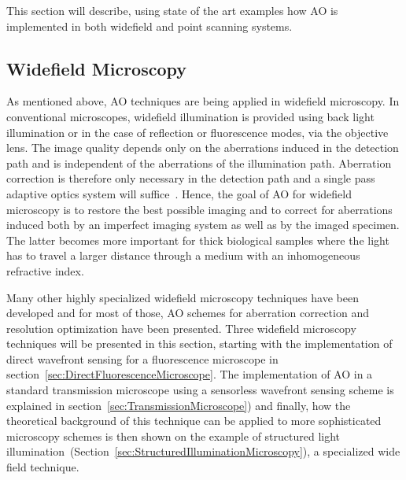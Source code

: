 This section will describe, using state of the art examples how AO is implemented in both widefield and point scanning systems.  

\subsection{Widefield Microscopy}
\label{sec:WidefieldMicroscopy}

As mentioned above, AO techniques are being applied in widefield microscopy. In conventional microscopes, widefield illumination is provided using back light illumination or in the case of reflection or fluorescence modes, via the objective lens. The image quality depends only on the aberrations induced in the detection path and is independent of the aberrations of the illumination path. Aberration correction is therefore only necessary in the detection path and a single pass adaptive optics system will suffice~\cite{book_aberrations}. Hence, the goal of AO for widefield microscopy is to restore the best possible imaging and to correct for aberrations induced both by an imperfect imaging system as well as by the imaged specimen. The latter becomes more important for thick biological samples where the light has to travel a larger distance through a medium with an inhomogeneous refractive index. 

Many other highly specialized widefield microscopy techniques have been developed and for most of those, AO schemes for aberration correction and resolution optimization have been presented. Three widefield microscopy techniques will be presented in this section, starting with the implementation of direct wavefront sensing for a fluorescence microscope in section~\ref{sec:DirectFluorescenceMicroscope}. The implementation of AO in a standard transmission microscope using a sensorless wavefront sensing scheme is explained in section~\ref{sec:TransmissionMicroscope}) and finally, how the theoretical background of this technique can be applied to more sophisticated microscopy schemes is then shown on the example of structured light illumination~(Section~\ref{sec:StructuredIlluminationMicroscopy}), a specialized wide field technique. 


